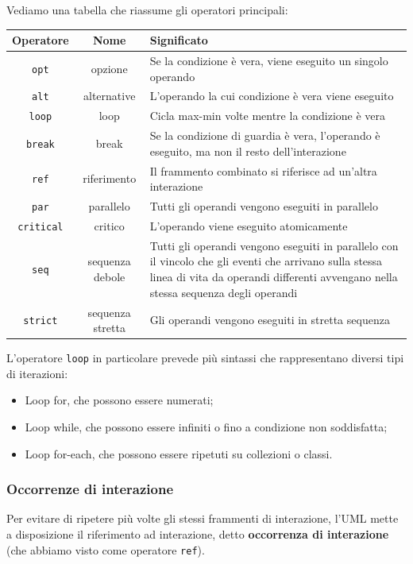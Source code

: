 \documentclass[a4paper,11pt]{article}
\begin{document}
Vediamo una tabella che riassume gli operatori principali:
\begin{table}[H]
	\center {}
	\begin{tabular} { c | c | p{9cm} }
		\bfseries Operatore & \bfseries Nome & \bfseries Significato \\
		\hline 
		\lstinline|opt| & opzione & Se la condizione è vera, viene eseguito un singolo operando \\ 
		\lstinline|alt| & alternative & L’operando la cui condizione è vera viene eseguito \\ 
		\lstinline|loop| & loop & Cicla max-min volte mentre la condizione è vera \\ 
		\lstinline|break| & break & Se la condizione di guardia è vera, l’operando è eseguito, ma non il resto dell’interazione \\ 
		\lstinline|ref| & riferimento & Il frammento combinato si riferisce ad un’altra interazione \\ 
		\lstinline|par| & parallelo & Tutti gli operandi vengono eseguiti in parallelo \\ 
		\lstinline|critical| & critico & L’operando viene eseguito atomicamente \\ 
		\lstinline|seq| & sequenza debole & Tutti gli operandi vengono eseguiti in parallelo con il vincolo che gli eventi che arrivano sulla stessa linea di vita da operandi differenti avvengano nella stessa sequenza degli operandi \\ 
		\lstinline|strict| & sequenza stretta & Gli operandi vengono eseguiti in stretta sequenza
	\end{tabular}
\end{table}

L'operatore \lstinline|loop| in particolare prevede più sintassi che rappresentano diversi tipi di iterazioni:
\begin{itemize}
	\item Loop for, che possono essere numerati;
	\item Loop while, che possono essere infiniti o fino a condizione non soddisfatta;
	\item Loop for-each, che possono essere ripetuti su collezioni o classi.
\end{itemize}

\subsubsection{Occorrenze di interazione}
Per evitare di ripetere più volte gli stessi frammenti di interazione, l'UML  mette a disposizione il riferimento ad interazione, detto \textbf{occorrenza di interazione} (che abbiamo visto come operatore \lstinline|ref|).
\end{document}
